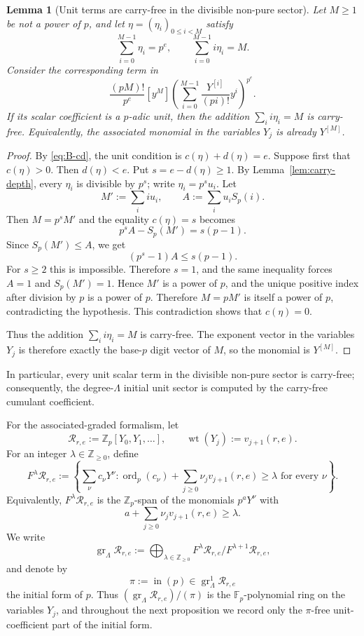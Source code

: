 \documentclass[11pt]{amsart}
\numberwithin{equation}{section}
\newtheorem{lemma}[lemma]{Lemma}
\DeclareMathOperator{\ordop}{ord}
\newcommand{\gr}{\operatorname{gr}}
\newcommand{\Zp}{\mathbb{Z}_p}
\newcommand{\Fp}{\mathbb{F}_p}
\newcommand{\Sp}{S_p}
\newcommand{\vp}{\ordop_p}
\newcommand{\wt}{\operatorname{wt}}
\begin{document}
\begin{lemma}[Unit terms are carry-free in the divisible non-pure sector]\label{lem:unit-carryfree-pe}
Let $M\ge1$ be not a power of $p$, and let $\eta=(\eta_i)_{0\le i<M}$ satisfy
\[
        \sum_{i=0}^{M-1}\eta_i=p^e,
        \qquad
        \sum_{i=0}^{M-1}i\eta_i=M.
\]
Consider the corresponding term in
\[
        \frac{(pM)!}{p^e}[y^M]
        \left(\sum_{i=0}^{M-1}\frac{Y^{[i]}}{(pi)!}y^i\right)^{p^e}.
\]
If its scalar coefficient is a $p$-adic unit, then the addition $\sum_i i\eta_i=M$ is carry-free.  Equivalently, the associated monomial in the variables $Y_j$ is already $Y^{[M]}$.
\end{lemma}
\begin{proof}
By \eqref{eq:B-cd}, the unit condition is $c(\eta)+d(\eta)=e$.  Suppose first that $c(\eta)>0$.  Then $d(\eta)<e$.  Put $s=e-d(\eta)\ge1$.  By Lemma~\ref{lem:carry-depth}, every $\eta_i$ is divisible by $p^s$; write $\eta_i=p^su_i$.  Let
\[
        M':=\sum_i iu_i,
        \qquad
        A:=\sum_i u_i\Sp(i).
\]
Then $M=p^sM'$ and the equality $c(\eta)=s$ becomes
\[
        p^sA-\Sp(M')=s(p-1).
\]
Since $\Sp(M')\le A$, we get
\[
        (p^s-1)A\le s(p-1).
\]
For $s\ge2$ this is impossible.  Therefore $s=1$, and the same inequality forces $A=1$ and $\Sp(M')=1$.  Hence $M'$ is a power of $p$, and the unique positive index after division by $p$ is a power of $p$.  Therefore $M=pM'$ is itself a power of $p$, contradicting the hypothesis.  This contradiction shows that $c(\eta)=0$.

Thus the addition $\sum_i i\eta_i=M$ is carry-free.  The exponent vector in the variables $Y_j$ is therefore exactly the base-$p$ digit vector of $M$, so the monomial is $Y^{[M]}$.
\end{proof}

In particular, every unit scalar term in the divisible non-pure sector is carry-free; consequently, the degree-$\Lambda$ initial unit sector is computed by the carry-free cumulant coefficient.

For the associated-graded formalism, let
\[
        \mathcal R_{r,e}:=\Zp[Y_0,Y_1,\ldots],
        \qquad
        \wt(Y_j):=v_{j+1}(r,e).
\]
For an integer $\lambda\in\mathbb Z_{\ge0}$, define
\[
        F^\lambda\mathcal R_{r,e}:=
        \left\{\sum_{\nu} c_\nu Y^\nu:
        \vp(c_\nu)+\sum_{j\ge0}\nu_jv_{j+1}(r,e)\ge \lambda
        \text{ for every }\nu\right\}.
\]
Equivalently, $F^\lambda\mathcal R_{r,e}$ is the $\Zp$-span of the monomials $p^aY^\nu$ with
\[
        a+\sum_{j\ge0}\nu_jv_{j+1}(r,e)\ge \lambda.
\]
We write
\[
        \gr_\Lambda\mathcal R_{r,e}:=\bigoplus_{\lambda\in\mathbb Z_{\ge0}}F^\lambda\mathcal R_{r,e}/F^{\lambda+1}\mathcal R_{r,e},
\]
and denote by
\[
        \pi:=\operatorname{in}(p)\in \gr_\Lambda^1\mathcal R_{r,e}
\]
the initial form of $p$.  Thus $(\gr_\Lambda\mathcal R_{r,e})/(\pi)$ is the $\Fp$-polynomial ring on the variables $Y_j$, and throughout the next proposition we record only the $\pi$-free unit-coefficient part of the initial form.
\end{document}
